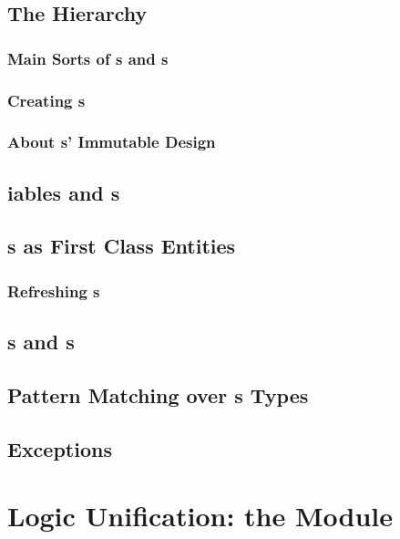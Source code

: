 \documentclass[presentation]{beamer}
\begin{document}
\subsection{The  Hierarchy}

\subsubsection{Main Sorts of s and s}

\subsubsection{Creating s}

\subsubsection{About s' Immutable Design}

\subsection{iables and s}

\subsection{s as First Class Entities}

\subsubsection{Refreshing s}

\subsection{s and s}

\subsection{Pattern Matching over s Types}

\subsection{Exceptions}

\section{Logic Unification: the  Module}
\end{document}
